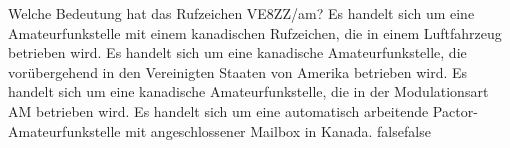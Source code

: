     {Welche Bedeutung hat das Rufzeichen VE8ZZ/am?}
    {Es handelt sich um eine Amateurfunkstelle mit einem kanadischen Rufzeichen, die in einem Luftfahrzeug betrieben wird.}
    {Es handelt sich um eine kanadische Amateurfunkstelle, die vorübergehend in den Vereinigten Staaten von Amerika betrieben wird.}
    {Es handelt sich um eine kanadische Amateurfunkstelle, die in der Modulationsart AM betrieben wird.}
    {Es handelt sich um eine automatisch arbeitende Pactor-Amateurfunkstelle mit angeschlossener Mailbox in Kanada.}
    {false}{false}